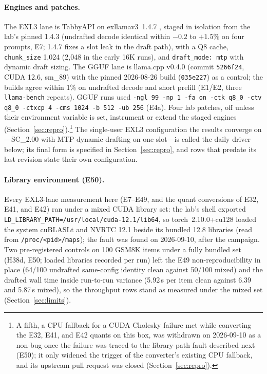 \documentclass[11pt]{article}
\newcommand{\q}[1]{\texttt{#1}}
\begin{document}
\paragraph{Engines and patches.}
The EXL3 lane is TabbyAPI \citep{theroyallab2025tabbyapi} on
exllamav3~1.4.7 \citep{turboderp2025exllamav3}, staged in isolation from the
lab's pinned 1.4.3 (undrafted decode identical within $-0.2$ to $+1.5\%$ on
four prompts, E7; 1.4.7 fixes a slot leak in the draft path), with a Q8
cache, \q{chunk\_size} 1,024 (2,048 in the early 16K runs), and
\q{draft\_mode: mtp} with dynamic draft sizing. The GGUF lane is llama.cpp
v0.4.0 \citep{gerganov2023llamacpp} (commit \q{5266f24}, CUDA 12.6, sm\_89)
with the pinned 2026-08-26 build (\q{035e227}) as a control; the builds agree
within 1\% on undrafted decode and short prefill (E1/E2, three \q{llama-bench}
repeats). GGUF runs used \q{-ngl 99 -np 1 -fa on -ctk q8\_0 -ctv q8\_0 -ctxcp
4 -cms 1024 -b 512 -ub 256} (E4a). Four lab patches, off unless their
environment variable is set, instrument or extend the staged engines
(Section~\ref{sec:repro}).\footnote{A fifth, a CPU fallback for a CUDA
Cholesky failure met while converting the E32, E41, and E42 quants on this
box, was withdrawn on 2026-09-10 as a non-bug once the failure was traced to
the library-path fault described next (E50); it only widened the trigger of
the converter's existing CPU fallback, and its upstream pull request was
closed (Section~\ref{sec:repro}).} The single-user EXL3 configuration the
results converge on---SC\_2.00 with MTP dynamic drafting on one slot---is
called the daily driver below; its final form is specified in
Section~\ref{sec:repro}, and rows that predate its last revision state their
own configuration.

\paragraph{Library environment (E50).}
Every EXL3-lane measurement here (E7--E49, and the quant conversions of E32,
E41, and E42) ran under a mixed CUDA library set: the lab's shell exported
\q{LD\_LIBRARY\_PATH=/usr/local/cuda-12.1/lib64}, so torch~2.10.0+cu128
loaded the system cuBLASLt and NVRTC 12.1 beside its bundled 12.8 libraries
(read from \q{/proc/<pid>/maps}); the fault was found on 2026-09-10, after
the campaign. Two pre-registered controls on 100 GSM8K items under a fully
bundled set (H38d, E50; loaded libraries recorded per run) left the E49
non-reproducibility in place (64/100 undrafted same-config identity clean
against 50/100 mixed) and the drafted wall time inside run-to-run variance
(5.92\,s per item clean against 6.39 and 5.87\,s mixed), so the throughput
rows stand as measured under the mixed set (Section~\ref{sec:limits}).
\end{document}
